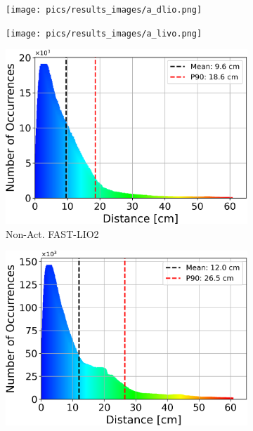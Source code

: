\documentclass[a4paper, conference]{IEEEtran}
\begin{document}
\begin{figure}
\begin{subfigure}{0.195\textwidth}
    \label{fig:results_act_lio}
\end{subfigure}
\begin{subfigure}{0.195\textwidth}
    \centering
    \texttt{[image: pics/results\_images/a\_dlio.png]}
    \label{fig:results_act_dlio}
\end{subfigure}
\begin{subfigure}{0.195\textwidth}
    \centering
    \texttt{[image: pics/results\_images/a\_livo.png]}
    \label{fig:results_act_livo}
\end{subfigure}

\begin{subfigure}{0.19\textwidth}
    \centering
    \includegraphics[width=\textwidth]{pics/histogram_results/histogram_cond_non_actuated_lio.png}
    \caption{Non-Act. FAST-LIO2}
    \label{fig:hist_non_lio}
\end{subfigure}
\hfill
\begin{subfigure}{0.19\textwidth}
    \centering
    \includegraphics[width=\textwidth]{pics/histogram_results/histogram_cond_non_actuated_livo.png}

\end{subfigure}
\end{figure}
\end{document}
